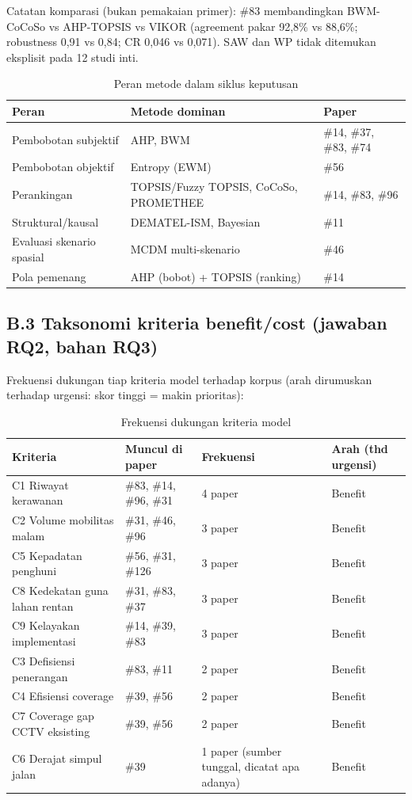 \documentclass[a4paper,11pt]{article}
\begin{document}
Catatan komparasi (bukan pemakaian primer): \#83 membandingkan BWM-CoCoSo vs AHP-TOPSIS vs VIKOR (agreement pakar 92,8\% vs 88,6\%; robustness 0,91 vs 0,84; CR 0,046 vs 0,071). SAW dan WP tidak ditemukan eksplisit pada 12 studi inti.

\begin{table}[htbp]
\centering
\begin{tabular}{p{4cm}p{4cm}p{6.5cm}}
\toprule
\textbf{Peran} & \textbf{Metode dominan} & \textbf{Paper} \\
\midrule
Pembobotan subjektif & AHP, BWM & \#14, \#37, \#83, \#74 \\
Pembobotan objektif & Entropy (EWM) & \#56 \\
Perankingan & TOPSIS/Fuzzy TOPSIS, CoCoSo, PROMETHEE & \#14, \#83, \#96 \\
Struktural/kausal & DEMATEL-ISM, Bayesian & \#11 \\
Evaluasi skenario spasial & MCDM multi-skenario & \#46 \\
Pola pemenang & AHP (bobot) + TOPSIS (ranking) & \#14 \\
\bottomrule
\end{tabular}
\caption{Peran metode dalam siklus keputusan}
\end{table}

\subsection*{B.3 Taksonomi kriteria benefit/cost (jawaban RQ2, bahan RQ3)}

Frekuensi dukungan tiap kriteria model terhadap korpus (arah dirumuskan terhadap urgensi: skor tinggi = makin prioritas):

\begin{table}[htbp]
\centering
\begin{tabular}{p{4cm}p{4cm}p{2.5cm}p{3cm}}
\toprule
\textbf{Kriteria} & \textbf{Muncul di paper} & \textbf{Frekuensi} & \textbf{Arah (thd urgensi)} \\
\midrule
C1 Riwayat kerawanan & \#83, \#14, \#96, \#31 & 4 paper & Benefit \\
C2 Volume mobilitas malam & \#31, \#46, \#96 & 3 paper & Benefit \\
C5 Kepadatan penghuni & \#56, \#31, \#126 & 3 paper & Benefit \\
C8 Kedekatan guna lahan rentan & \#31, \#83, \#37 & 3 paper & Benefit \\
C9 Kelayakan implementasi & \#14, \#39, \#83 & 3 paper & Benefit \\
C3 Defisiensi penerangan & \#83, \#11 & 2 paper & Benefit \\
C4 Efisiensi coverage & \#39, \#56 & 2 paper & Benefit \\
C7 Coverage gap CCTV eksisting & \#39, \#56 & 2 paper & Benefit \\
C6 Derajat simpul jalan & \#39 & 1 paper (sumber tunggal, dicatat apa adanya) & Benefit \\
\bottomrule
\end{tabular}
\caption{Frekuensi dukungan kriteria model}
\end{table}
\end{document}
